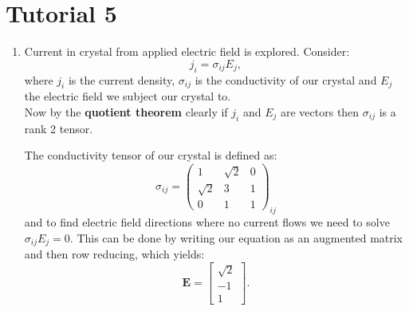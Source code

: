 \pagestyle{fancy}
\fancyhead{}

\section{Tutorial 5}
\begin{enumerate}
    \item Current in crystal from applied electric field is explored. Consider:
    $$j_i=\sigma_{ij}E_j,$$
    where $j_i$ is the current density, $\sigma_{ij}$ is the conductivity of our crystal and $E_j$ the electric field we subject our crystal to. \\

    Now by the \textbf{quotient theorem} clearly if $j_i$ and $E_j$ are vectors then $\sigma_{ij}$ is a rank 2 tensor.

    The conductivity tensor of our crystal is defined as:
    $$\sigma_{ij}=
    \begin{pmatrix}
        1 & \sqrt{2} & 0 \\
        \sqrt{2} & 3 & 1 \\
        0 & 1 & 1
    \end{pmatrix}_{ij}$$
    and to find electric field directions where no current flows we need to solve $\sigma_{ij}E_j=0$. This can be done by writing our equation as an augmented matrix and then row reducing, which yields:
    $$\boldsymbol{E}=\begin{bmatrix} \sqrt{2} \\ -1 \\ 1 \end{bmatrix}.$$
    
\end{enumerate}